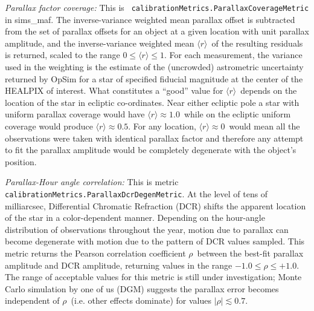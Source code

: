 {\it Parallax factor coverage:} This is {\tt
    calibrationMetrics.ParallaxCoverageMetric} in sims\_maf. The
  inverse-variance weighted mean parallax offset is subtracted from
  the set of parallax offsets for an object at a given location with
  unit parallax amplitude, and the inverse-variance weighted mean
  $\langle r \rangle$~of the resulting residuals is returned, scaled
  to the range $0 \le \langle r \rangle \le 1$. For each measurement,
  the variance used in the weighting is the estimate of the
  (uncrowded) astrometric uncertainty returned by OpSim for a star of
  specified fiducial magnitude at the center of the HEALPIX of
  interest. What constitutes a ``good'' value for $\langle r \rangle$~depends on the location
  of the star in ecliptic co-ordinates. Near either ecliptic pole a
  star with uniform parallax coverage would have $\langle r \rangle
  \approx 1.0$~while on the ecliptic uniform coverage would produce
  $\langle r \rangle \approx 0.5$. For any location, $\langle r
  \rangle \approx 0$~would mean all the observations were taken with
  identical parallax factor and therefore any attempt to fit the
  parallax amplitude would be completely degenerate with the object's
  position.

{\it Parallax-Hour angle correlation:} This is metric {\tt
    calibrationMetrics.ParallaxDcrDegenMetric}. At the level of tens
  of milliarcsec, Differential Chromatic Refraction (DCR) shifts the
  apparent location of the star in a color-dependent manner. Depending
  on the hour-angle distribution of observations throughout the year,
  motion due to parallax can become degenerate with motion due to the
  pattern of DCR values sampled. This metric returns the Pearson
  correlation coefficient $\rho$~between the best-fit parallax
  amplitude and DCR amplitude, returning values in the range $-1.0 \le
  \rho \le +1.0$. The range of acceptable values for this metric is
  still under investigation; Monte Carlo simulation by one of us (DGM)
  suggests the parallax error becomes independent of
  $\rho$~(i.e. other effects dominate) for values $|\rho| \lesssim
  0.7$.



